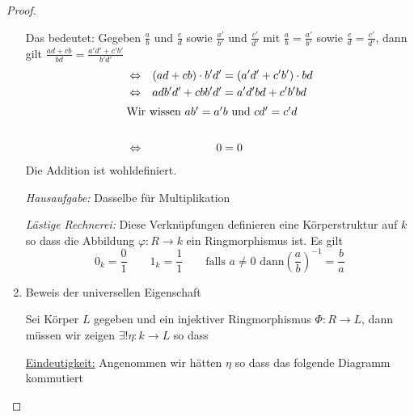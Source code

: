 \documentclass[12pt,parskip=full]{scrartcl}
\newcommand{\heading}{\underline}
\theoremstyle{definition}
\theoremstyle{remark}
\begin{document}
\begin{proof}
\begin{enumerate}
			Das bedeutet: Gegeben $\frac{a}{b}$ und $\frac{c}{d}$ sowie $\frac{a'}{b'}$ und $\frac{c'}{d'}$ mit $\frac{a}{b} = \frac{a'}{b'}$ sowie $\frac{c}{d} = \frac{c'}{d'}$, dann gilt $\frac{ad + cb}{bd} = \frac{a'd' + c'b'}{b'd'}$
			\begin{align*}
				&\Leftrightarrow& (ad + cb) \cdot b'd' &= (a'd' + c'b') \cdot bd \\
				&\Leftrightarrow& adb'd' + cbb'd' &= a'd'bd + c'b'bd \\
				\intertext{Wir wissen $ab' = a'b$ und $cd' = c'd$} \\
				&\Leftrightarrow& 0 &= 0
			\end{align*}
			Die Addition ist wohldefiniert.
			
			\textit{Hausaufgabe:} Dasselbe für Multiplikation
			
			\textit{Lästige Rechnerei:} Diese Verknüpfungen definieren eine Körperstruktur auf $k$ so dass die Abbildung $\varphi: R \to k$ ein Ringmorphismus ist. Es gilt
			\begin{equation*}
				0_k = \frac01 \qquad 1_k = \frac11 \qquad \text{falls $a \neq 0$ dann} \left( \frac{a}{b} \right)^{-1} = \frac{b}{a}
			\end{equation*}
			
			\item Beweis der universellen Eigenschaft
			
			Sei Körper $L$ gegeben und ein injektiver Ringmorphismus $\Phi: R \to L$, dann müssen wir zeigen $\exists! \eta: k \to L$ so dass \textellipsis
			
			\heading{Eindeutigkeit:} Angenommen wir hätten $\eta$ so dass das folgende Diagramm kommutiert
			\begin{center}
\end{center}
\end{enumerate}
\end{proof}
\end{document}
